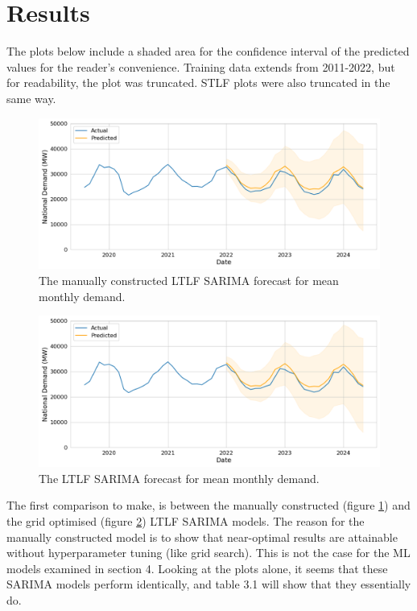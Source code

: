 \documentclass[12pt]{scrreprt}
\begin{document}
\newpage

\section{Results}

The plots below include a shaded area for the confidence interval of the predicted values for the reader's convenience. Training data extends from 2011-2022, but for readability, the plot was truncated. STLF plots were also truncated in the same way.

\begin{figure}[h!]
    \centering
    \includegraphics[scale=0.5]{Images/ltts_of_fcast.png}
    \caption{The manually constructed LTLF SARIMA forecast for mean monthly demand.}
    \label{fig:ltts_of_fcast}
\end{figure}

\begin{figure}[h!]
    \centering
    \includegraphics[scale=0.5]{Images/ltts_grid_fcast.png}
    \caption{The LTLF SARIMA forecast for mean monthly demand.}
    \label{fig:ltts_grid_fcast}
\end{figure}

The first comparison to make, is between the manually constructed (figure \ref{fig:ltts_of_fcast}) and the grid optimised (figure \ref{fig:ltts_grid_fcast}) LTLF SARIMA models. The reason for the manually constructed model is to show that near-optimal results are attainable without hyperparameter tuning (like grid search). This is not the case for the ML models examined in section 4. Looking at the plots alone, it seems that these SARIMA models perform identically, and table 3.1 will show that they essentially do.
\end{document}
